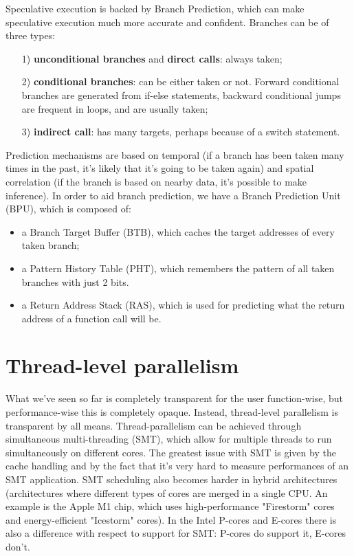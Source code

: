 Speculative execution is backed by Branch Prediction, which can make speculative execution much more accurate and confident. Branches can be of three types:
\begin{itemize}
    \item [1)] \textbf{unconditional branches} and \textbf{direct calls}: always taken;
    \item [2)] \textbf{conditional branches}: can be either taken or not. Forward conditional branches are generated from if-else statements, backward conditional jumps are frequent in loops, and are usually taken;
    \item [3)] \textbf{indirect call}: has many targets, perhaps because of a switch statement.
\end{itemize}

Prediction mechanisms are based on temporal (if a branch has been taken many times in the past, it's likely that it's going to be taken again) and spatial correlation (if the branch is based on nearby data, it's possible to make inference).
\nwl
In order to aid branch prediction, we have a Branch Prediction Unit (BPU), which is composed of:
\begin{itemize}
    \item a Branch Target Buffer (BTB), which caches the target addresses of every taken branch;
    \item a Pattern History Table (PHT), which remembers the pattern of all taken branches with just 2 bits. 
    \item a Return Address Stack (RAS), which is used for predicting what the return address of a function call will be.
\end{itemize}

\section{Thread-level parallelism}

What we've seen so far is completely transparent for the user function-wise, but performance-wise this is completely opaque. Instead, thread-level parallelism is transparent by all means. 
\nwl
Thread-parallelism can be achieved through simultaneous multi-threading (SMT), which allow for multiple threads to run simultaneously on different cores. The greatest issue with SMT is given by the cache handling and by the fact that it's very hard to measure performances of an SMT application.
\nwl
SMT scheduling also becomes harder in hybrid architectures (architectures where different types of cores are merged in a single CPU. An example is the Apple M1 chip, which uses high-performance "Firestorm" cores and energy-efficient "Icestorm" cores). In the Intel P-cores and E-cores there is also a difference with respect to support for SMT: P-cores do support it, E-cores don't.

